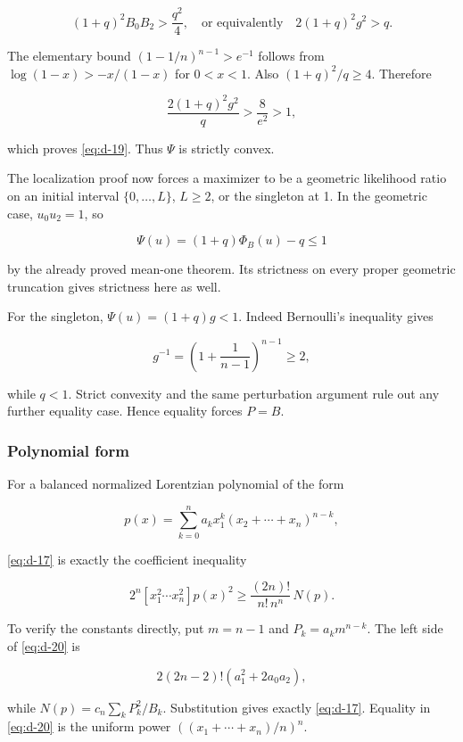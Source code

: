 \documentclass[11pt,a4paper]{article}
\theoremstyle{definition}
\theoremstyle{remark}
\begin{document}
\begin{equation}\label{eq:d-19}
(1+q)^2B_0B_2>\frac{q^2}{4},
\quad\text{or equivalently}\quad
2(1+q)^2g^2>q.
\end{equation}

The elementary bound \((1-1/n)^{n-1}>e^{-1}\) follows from
\(\log(1-x)>-x/(1-x)\) for \(0<x<1\). Also \((1+q)^2/q\ge4\). Therefore

\[
\frac{2(1+q)^2g^2}{q}>\frac8{e^2}>1,
\]

which proves \eqref{eq:d-19}. Thus \(\Psi\) is strictly convex.

The localization proof now forces a maximizer to be a geometric
likelihood ratio on an initial interval \(\{0,\ldots,L\}\), \(L\ge2\),
or the singleton at 1. In the geometric case, \(u_0u_2=1\), so

\[
\Psi(u)=(1+q)\Phi_B(u)-q\le1
\]

by the already proved mean-one theorem. Its strictness on every proper
geometric truncation gives strictness here as well.

For the singleton, \(\Psi(u)=(1+q)g<1\). Indeed Bernoulli's inequality
gives

\[
g^{-1}=\left(1+\frac1{n-1}\right)^{n-1}\ge2,
\]

while \(q<1\). Strict convexity and the same perturbation argument rule
out any further equality case. Hence equality forces \(P=B\).

\subsubsection{Polynomial form}\label{scalar-polynomial-form}

For a balanced normalized Lorentzian polynomial of the form

\[
p(x)=\sum_{k=0}^n a_k x_1^k(x_2+\cdots+x_n)^{n-k},
\]

\eqref{eq:d-17} is exactly the coefficient inequality

\begin{equation}\label{eq:d-20}
\boxed{\quad
2^n[x_1^2\cdots x_n^2]p(x)^2
\ge\frac{(2n)!}{n!\,n^n}\,N(p).
\quad}
\end{equation}

To verify the constants directly, put \(m=n-1\) and \(P_k=a_km^{n-k}\).
The left side of \eqref{eq:d-20} is

\[
2(2n-2)!(a_1^2+2a_0a_2),
\]

while \(N(p)=c_n\sum_kP_k^2/B_k\). Substitution gives exactly \eqref{eq:d-17}.
Equality in \eqref{eq:d-20} is the uniform power \(((x_1+\cdots+x_n)/n)^n\).
\end{document}
